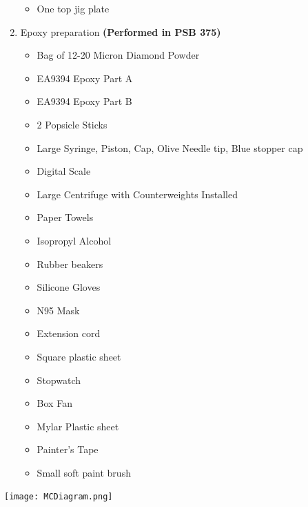\documentclass[12pt]{cornelltfpxsop}
\begin{document}
\begin{enumerate}
\begin{itemize}
        \item One top jig plate
    \end{itemize}
\item Epoxy preparation \textbf{(Performed in PSB 375)}
    \begin{itemize}
        \item Bag of 12-20 Micron Diamond Powder
        \item EA9394 Epoxy Part A
        \item EA9394 Epoxy Part B
        \item 2 Popsicle Sticks
        \item Large Syringe, Piston, Cap, Olive Needle tip, Blue stopper cap
        \item Digital Scale
        \item Large Centrifuge with Counterweights Installed
        \item Paper Towels
        \item Isopropyl Alcohol
        \item Rubber beakers
        \item Silicone Gloves
        \item N95 Mask
        \item Extension cord
        \item Square plastic sheet
        \item Stopwatch
        \item Box Fan
        \item Mylar Plastic sheet
        \item Painter's Tape
        \item Small soft paint brush
    \end{itemize}
\end{enumerate}
\texttt{[image: MCDiagram.png]}
\end{document}
